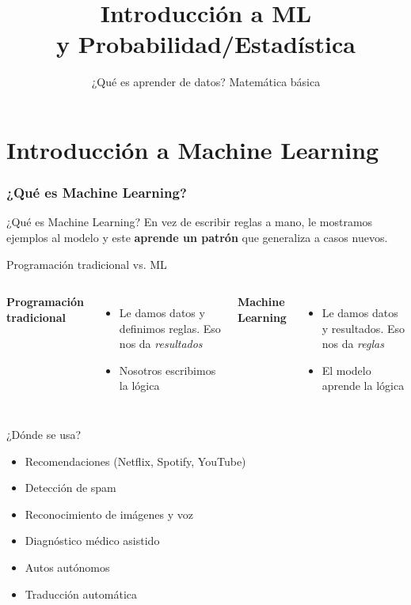 

\title{Introducción a ML \\ y Probabilidad/Estadística}
\subtitle{¿Qué es aprender de datos? Matemática básica}
\date{}



\frame{\titlepage}

\part{Introducción a Machine Learning}
\frame{\partpage}

\section{¿Qué es Machine Learning?}

\begin{frame}{¿Qué es Machine Learning?}
  \pause
  En vez de escribir reglas a mano, le mostramos ejemplos al modelo
  y este \textbf{aprende un patrón} que generaliza a casos nuevos.
\end{frame}

\begin{frame}{Programación tradicional vs. ML}
  \begin{columns}
    \textbf{Programación tradicional}
    \begin{itemize}
      \item Le damos datos y definimos reglas. Eso nos da \textit{resultados}
      \item Nosotros escribimos la lógica
    \end{itemize}
    \textbf{Machine Learning}
    \begin{itemize}
      \item Le damos datos y resultados. Eso nos da \textit{reglas}
      \item El modelo aprende la lógica
    \end{itemize}
  \end{columns}
\end{frame}

\begin{frame}{¿Dónde se usa?}
  \begin{itemize}
    \item Recomendaciones (Netflix, Spotify, YouTube)
    \item Detección de spam
    \item Reconocimiento de imágenes y voz
    \item Diagnóstico médico asistido
    \item Autos autónomos
    \item Traducción automática
  \end{itemize}
\end{frame}

